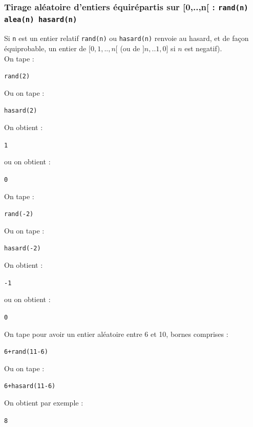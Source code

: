 \documentclass[a4paper,11pt]{book}
\begin{document}
\subsubsection{Tirage al\'eatoire d'entiers \'equir\'epartis sur [0,..,n[ : {\tt rand(n) alea(n) hasard(n)}}
Si {\tt n} est un entier relatif {\tt rand(n)} ou {\tt hasard(n)} renvoie au 
hasard, et de fa\c{c}on \'equiprobable, un entier de $[0,1,..,n[$ 
(ou de $]n,..1,0]$ si $n$ est negatif).\\
On tape :
\begin{center}{\tt rand(2)}\end{center}
Ou on tape :
\begin{center}{\tt hasard(2)}\end{center}
On obtient :
\begin{center}{\tt  1}\end{center}
ou on obtient :
\begin{center}{\tt  0}\end{center}
On tape :
\begin{center}{\tt rand(-2)}\end{center}
Ou on tape :
\begin{center}{\tt hasard(-2)}\end{center}
On obtient :
\begin{center}{\tt  -1}\end{center}
ou on obtient :
\begin{center}{\tt  0}\end{center}
On tape pour avoir un entier al\'eatoire entre 6 et 10, bornes comprises :
\begin{center}{\tt 6+rand(11-6)}\end{center}
Ou on tape :
\begin{center}{\tt 6+hasard(11-6)}\end{center}
On obtient par exemple :
\begin{center}{\tt  8}\end{center}
\end{document}
